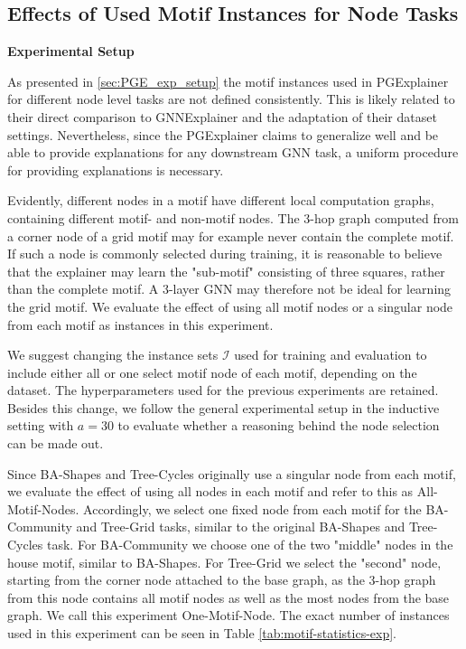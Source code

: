 \subsection{Effects of Used Motif Instances for Node Tasks}
\label{sec:motif_set_experiment}

\textbf{Experimental Setup} \par
As presented in \ref{sec:PGE_exp_setup} the motif instances used in PGExplainer \cite{luo2020parameterized} for different node level tasks are not defined consistently. This is likely related to their direct comparison to GNNExplainer \cite{ying2019gnnexplainer} and the adaptation of their dataset settings. Nevertheless, since the PGExplainer claims to generalize well and be able to provide explanations for any downstream GNN task, a uniform procedure for providing explanations is necessary. 

Evidently, different nodes in a motif have different local computation graphs, containing different motif- and non-motif nodes. The 3-hop graph computed from a corner node of a grid motif may for example never contain the complete motif. If such a node is commonly selected during training, it is reasonable to believe that the explainer may learn the "sub-motif" consisting of three squares, rather than the complete motif. A 3-layer GNN may therefore not be ideal for learning the grid motif. We evaluate the effect of using all motif nodes or a singular node from each motif as instances in this experiment.

We suggest changing the instance sets $\mathcal{I}$ used for training and evaluation to include either all or one select motif node of each motif, depending on the dataset. The hyperparameters used for the previous experiments are retained. Besides this change, we follow the general experimental setup in the inductive setting with $a=30$ to evaluate whether a reasoning behind the node selection can be made out. \bigskip

Since BA-Shapes and Tree-Cycles originally use a singular node from each motif, we evaluate the effect of using all nodes in each motif and refer to this as All-Motif-Nodes. Accordingly, we select one fixed node from each motif for the BA-Community and Tree-Grid tasks, similar to the original BA-Shapes and Tree-Cycles task. For BA-Community we choose one of the two "middle" nodes in the house motif, similar to BA-Shapes. For Tree-Grid we select the "second" node, starting from the corner node attached to the base graph, as the 3-hop graph from this node contains all motif nodes as well as the most nodes from the base graph. We call this experiment One-Motif-Node. The exact number of instances used in this experiment can be seen in Table \ref{tab:motif-statistics-exp}.

